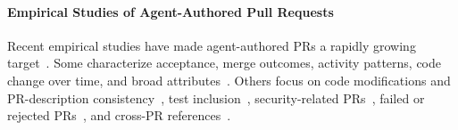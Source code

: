 \documentclass[10pt,conference,anonymous]{IEEEtran}
\begin{document}
\paragraph{Empirical Studies of Agent-Authored Pull Requests}
%
Recent empirical studies have made agent-authored PRs a rapidly growing target~\cite{liAIDevStudyingAICodingAgents2026,liRiseAITeammates2025a}.
Some characterize acceptance, merge outcomes, activity patterns, code change over time, and broad attributes~\cite{watanabeUseAgenticCoding2026,popescu2026autonomous,yoshiokaLetsMakeEvery2026}.
Others focus on code modifications and PR-description consistency~\cite{ogenrwotHowAICoding2026}, test inclusion~\cite{haqueAutonomousAgentsContribute2026}, security-related PRs~\cite{siddiqSecurityAgeAI2026}, failed or rejected PRs~\cite{ehsaniWhereAICodingAgentsFail2026}, and cross-PR references~\cite{khemissiHumansIntegrateAgentsFix2026}.
\end{document}
